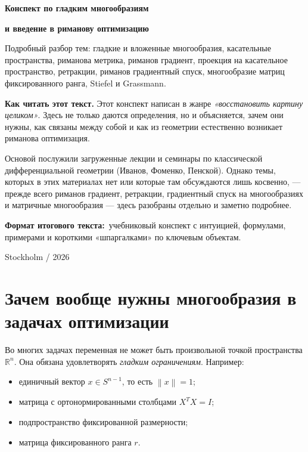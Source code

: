 \documentclass[12pt,a4paper]{article}
\theoremstyle{rudef}
\theoremstyle{ruplain}
\newcommand{\R}{\mathbb{R}}
\newcommand{\norm}[1]{\left\lVert #1\right\rVert}
\begin{document}
\begin{titlepage}
\thispagestyle{empty}
\vspace*{2.8cm}

{\Large\color{Accent}\bfseries Конспект по гладким многообразиям\par}
\vspace{0.35cm}
{\Large\color{Accent}\bfseries и введение в риманову оптимизацию\par}

\vspace{1.2cm}
{\large Подробный разбор тем: гладкие и вложенные многообразия, касательные пространства, риманова метрика, риманов градиент, проекция на касательное пространство, ретракции, риманов градиентный спуск, многообразие матриц фиксированного ранга, Stiefel и Grassmann.\par}

\vspace{1.2cm}
\begin{summarybox}
\textbf{Как читать этот текст.} Этот конспект написан в жанре \emph{«восстановить картину целиком»}. Здесь не только даются определения, но и объясняется, зачем они нужны, как связаны между собой и как из геометрии естественно возникает риманова оптимизация.

Основой послужили загруженные лекции и семинары по классической дифференциальной геометрии (Иванов, Фоменко, Пенской). Однако темы, которых в этих материалах нет или которые там обсуждаются лишь косвенно, --- прежде всего риманов градиент, ретракции, градиентный спуск на многообразиях и матричные многообразия --- здесь разобраны отдельно и заметно подробнее.
\end{summarybox}

\vfill
{\large \textbf{Формат итогового текста:}\ учебниковый конспект с интуицией, формулами, примерами и короткими «шпаргалками» по ключевым объектам.\par}

\vspace{1.0cm}
{\large Stockholm / 2026\par}
\end{titlepage}

\tableofcontents
\newpage

\section{Зачем вообще нужны многообразия в задачах оптимизации}

Во многих задачах переменная не может быть произвольной точкой пространства $\R^n$. Она обязана удовлетворять \emph{гладким ограничениям}. Например:
\begin{itemize}
  \item единичный вектор $x \in S^{n-1}$, то есть $\norm{x}=1$;
  \item матрица с ортонормированными столбцами $X^TX=I$;
  \item подпространство фиксированной размерности;
  \item матрица фиксированного ранга $r$.
\end{itemize}
\end{document}
